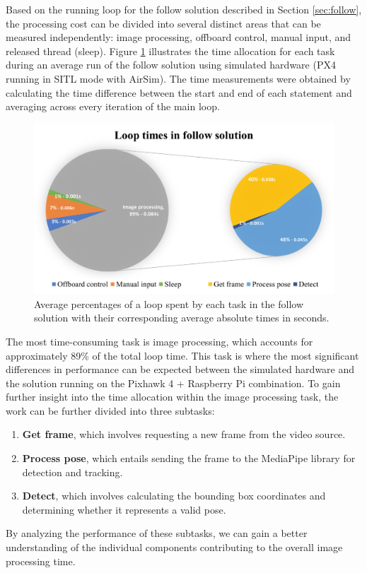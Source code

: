 
Based on the running loop for the follow solution described in Section \ref{sec:follow}, the processing cost can be divided into several distinct areas that can be measured independently: image processing, offboard control, manual input, and released thread (sleep). Figure \ref{fig:perf-sitl-sim} illustrates the time allocation for each task during an average run of the follow solution using simulated hardware (PX4 running in SITL mode with AirSim). The time measurements were obtained by calculating the time difference between the start and end of each statement and averaging across every iteration of the main loop.

\begin{figure}[H]
  \centering
  \includegraphics[width=.9\textwidth, keepaspectratio]{img/sitl-performance.png}
  \caption{Average percentages of a loop spent by each task in the follow solution with their corresponding average absolute times in seconds.}
  \label{fig:perf-sitl-sim}
\end{figure}


The most time-consuming task is image processing, which accounts for approximately 89\% of the total loop time. This task is where the most significant differences in performance can be expected between the simulated hardware and the solution running on the Pixhawk 4 + Raspberry Pi combination. To gain further insight into the time allocation within the image processing task, the work can be further divided into three subtasks:
\begin{enumerate}
    \item \textbf{Get frame}, which involves requesting a new frame from the video source.
    \item \textbf{Process pose}, which entails sending the frame to the MediaPipe library for detection and tracking.
    \item \textbf{Detect}, which involves calculating the bounding box coordinates and determining whether it represents a valid pose.
\end{enumerate}
By analyzing the performance of these subtasks, we can gain a better understanding of the individual components contributing to the overall image processing time.

